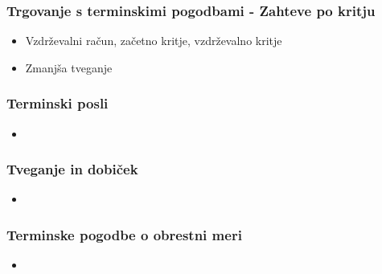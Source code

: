 \documentclass[14pt]{beamer}
\begin{document}
\begin{frame}
    \frametitle{Trgovanje s terminskimi pogodbami - Zahteve po kritju}
    
    \begin{itemize}
        \item Vzdrževalni račun, začetno kritje, vzdrževalno kritje
        \item Zmanjša tveganje 
    \end{itemize}


\end{frame}

\begin{frame}
    \frametitle{Terminski posli}
    
    \begin{itemize}
        \item
    \end{itemize}

\end{frame}

\begin{frame}
    \frametitle{Tveganje in dobiček}
    
    \begin{itemize}
        \item
    \end{itemize}

\end{frame}

\begin{frame}
    \frametitle{Terminske pogodbe o obrestni meri}
    
    \begin{itemize}
        \item
    \end{itemize}

\end{frame}
\end{document}
